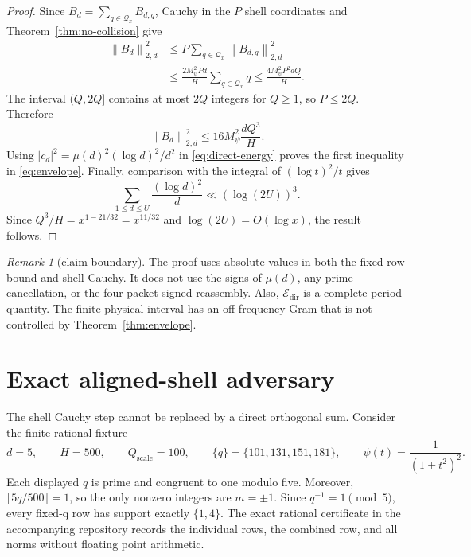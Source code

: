 \documentclass[11pt]{article}
\theoremstyle{definition}
\theoremstyle{remark}
\newtheorem{remark}[theorem]{Remark}
\newcommand{\Qx}{\mathcal Q_x}
\newcommand{\Edir}{\mathcal E_{\mathrm{dir}}}
\newcommand{\norm}[1]{\left\lVert #1\right\rVert}
\begin{document}
\begin{proof}
Since \(B_d=\sum_{q\in\Qx}B_{d,q}\), Cauchy in the \(P\) shell coordinates
and Theorem~\ref{thm:no-collision} give
\begin{align}
 \norm{B_d}_{2,d}^2
 &\le P\sum_{q\in\Qx}\norm{B_{d,q}}_{2,d}^2 \\
 &\le \frac{2M_\psi^2Pd}{H}\sum_{q\in\Qx}q
 \le \frac{4M_\psi^2P^2dQ}{H}.
 \label{eq:shell-cauchy}
\end{align}
The interval \((Q,2Q]\) contains at most \(2Q\) integers for \(Q\ge1\),
so \(P\le2Q\).  Therefore
\[
 \norm{B_d}_{2,d}^2\le16M_\psi^2\frac{dQ^3}{H}.
\]
Using \(|c_d|^2=\mu(d)^2(\log d)^2/d^2\) in \eqref{eq:direct-energy}
proves the first inequality in \eqref{eq:envelope}.  Finally,
comparison with the integral of \((\log t)^2/t\) gives
\[
 \sum_{1\le d\le U}\frac{(\log d)^2}{d}\ll(\log(2U))^3.
\]
Since \(Q^3/H=x^{1-21/32}=x^{11/32}\) and \(\log(2U)=O(\log x)\),
the result follows.
\end{proof}

\begin{remark}[claim boundary]
The proof uses absolute values in both the fixed-row bound and shell Cauchy.
It does not use the signs of \(\mu(d)\), any prime cancellation, or the
four-packet signed reassembly.  Also, \(\Edir\) is a complete-period quantity.
The finite physical interval has an off-frequency Gram that is not controlled
by Theorem~\ref{thm:envelope}.
\end{remark}

\section{Exact aligned-shell adversary}

The shell Cauchy step cannot be replaced by a direct orthogonal sum.  Consider
the finite rational fixture
\begin{equation}
 d=5,\qquad H=500,\qquad Q_{\mathrm{scale}}=100,
 \qquad \{q\} = \{101,131,151,181\},
 \qquad \psi(t)=\frac{1}{(1+t^2)^2}.
 \label{eq:adversary}
\end{equation}
Each displayed \(q\) is prime and congruent to one modulo five.  Moreover,
\(\lfloor5q/500\rfloor=1\), so the only nonzero integers are \(m=\pm1\).
Since \(q^{-1}=1\pmod5\), every fixed-q row has support exactly
\(\{1,4\}\).  The exact rational certificate in the accompanying repository
records the individual rows, the combined row, and all norms without floating
point arithmetic.
\end{document}
